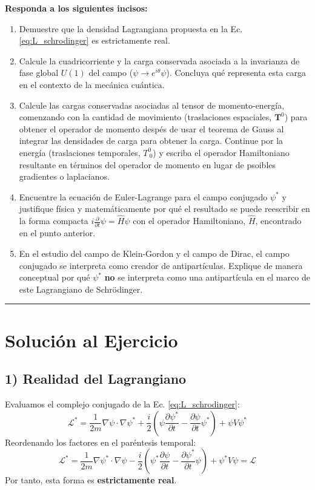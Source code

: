\textbf{Responda a los siguientes incisos:}
\begin{enumerate}
\item  Demuestre que la densidad Lagrangiana propuesta en la Ec. \eqref{eq:L_schrodinger} es estrictamente real. 
    \item Calcule la cuadricorriente y la carga conservada asociada a la invarianza de fase global $U(1)$ del campo ($\psi \to e^{i\theta}\psi$). Concluya qué representa esta carga en el contexto de la mecánica cuántica.
    \item  Calcule las cargas conservadas asociadas al tensor de momento-energía, comenzando con la cantidad de movimiento (traslaciones espaciales, $\mathbf{T}^0$) para obtener el operador de momento despés de usar el teorema de Gauss al integrar las densidades de carga para obtener la carga. Continue por la energía (traslaciones temporales, $T^0_{\ 0}$) y escriba el operador Hamiltoniano resultante en términos del operador de momento en lugar de psoibles gradientes o laplacianos.
    \item Encuentre la ecuación de Euler-Lagrange para el campo conjugado $\psi^*$ y justifique física y matemáticamente por qué el resultado se puede reescribir en la forma compacta $i\frac{\partial}{\partial t} \psi = \hat{H} \psi$ con el operador Hamiltoniano, $\hat{H}$, encontrado en el punto anterior.
    \item  En el estudio del campo de Klein-Gordon y el campo de Dirac, el campo conjugado se interpreta como creador de antipartículas. Explique de manera conceptual por qué $\psi^*$ \textbf{no} se interpreta como una antipartícula en el marco de este Lagrangiano de Schrödinger.
\end{enumerate}

\vspace{1cm}
\hrule
\vspace{1cm}

\section*{Solución al Ejercicio}


\subsection*{1) Realidad del Lagrangiano}
Evaluamos el complejo conjugado de la Ec. \eqref{eq:L_schrodinger}:
\begin{equation}
    \mathcal{L}^* = \frac{1}{2m} \nabla\psi \cdot \nabla\psi^* + \frac{i}{2} \left( \psi \frac{\partial \psi^*}{\partial t} - \frac{\partial \psi}{\partial t} \psi^* \right) + \psi V \psi^*
\end{equation}
Reordenando los factores en el paréntesis temporal:
\begin{equation}
    \mathcal{L}^* = \frac{1}{2m} \nabla\psi^* \cdot \nabla\psi - \frac{i}{2} \left( \psi^* \frac{\partial \psi}{\partial t} - \frac{\partial \psi^*}{\partial t} \psi \right) + \psi^* V \psi = \mathcal{L}
\end{equation}
Por tanto, esta forma es \textbf{estrictamente real}.

